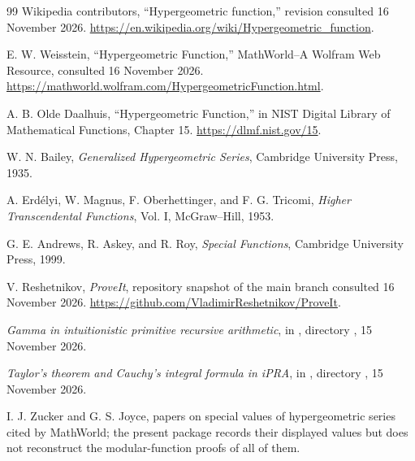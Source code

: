 \documentclass[11pt]{article}
\theoremstyle{definition}
\theoremstyle{remark}
\begin{document}














\begin{thebibliography}{99}
Wikipedia contributors, ``Hypergeometric function,'' revision consulted
16 November 2026. \url{https://en.wikipedia.org/wiki/Hypergeometric_function}.

E. W. Weisstein, ``Hypergeometric Function,'' MathWorld--A Wolfram Web
Resource, consulted 16 November 2026.
\url{https://mathworld.wolfram.com/HypergeometricFunction.html}.

A. B. Olde Daalhuis, ``Hypergeometric Function,'' in NIST Digital Library of
Mathematical Functions, Chapter 15. \url{https://dlmf.nist.gov/15}.

W. N. Bailey, \emph{Generalized Hypergeometric Series}, Cambridge University
Press, 1935.

A. Erd\'elyi, W. Magnus, F. Oberhettinger, and F. G. Tricomi,
\emph{Higher Transcendental Functions}, Vol. I, McGraw--Hill, 1953.

G. E. Andrews, R. Askey, and R. Roy, \emph{Special Functions}, Cambridge
University Press, 1999.

V. Reshetnikov, \emph{ProveIt}, repository snapshot of the main branch
consulted 16 November 2026.
\url{https://github.com/VladimirReshetnikov/ProveIt}.

\emph{Gamma in intuitionistic primitive recursive arithmetic}, in
\cite{proveit}, directory
,
15 November 2026.

\emph{Taylor's theorem and Cauchy's integral formula in iPRA}, in
\cite{proveit}, directory
,
15 November 2026.

I. J. Zucker and G. S. Joyce, papers on special values of hypergeometric
series cited by MathWorld; the present package records their displayed
values but does not reconstruct the modular-function proofs of all of them.
\end{thebibliography}
\end{document}
